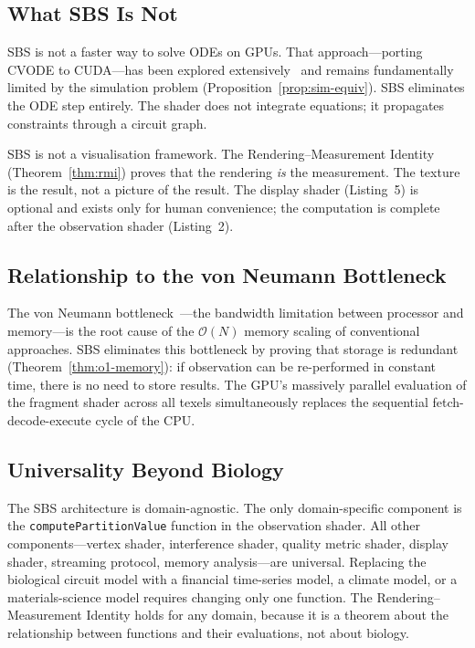 \documentclass[11pt,twocolumn,a4paper]{article}
\newcommand{\BigO}{\mathcal{O}}
\begin{document}
\subsection{What SBS Is Not}

SBS is not a faster way to solve ODEs on GPUs.  That approach---porting
CVODE to CUDA---has been explored extensively~\citep{owens2008,
nickolls2008} and remains fundamentally limited by the simulation
problem (Proposition~\ref{prop:sim-equiv}).  SBS eliminates the ODE
step entirely.  The shader does not integrate equations; it propagates
constraints through a circuit graph.

SBS is not a visualisation framework.  The Rendering--Measurement
Identity (Theorem~\ref{thm:rmi}) proves that the rendering \emph{is}
the measurement.  The texture is the result, not a picture of the
result.  The display shader (Listing~5) is optional and exists only
for human convenience; the computation is complete after the
observation shader (Listing~2).

\subsection{Relationship to the von Neumann Bottleneck}

The von Neumann bottleneck~\citep{backus1978}---the bandwidth
limitation between processor and memory---is the root cause of the
$\BigO(N)$ memory scaling of conventional approaches.  SBS eliminates
this bottleneck by proving that storage is redundant
(Theorem~\ref{thm:o1-memory}): if observation can be re-performed in
constant time, there is no need to store results.  The GPU's
massively parallel evaluation of the fragment shader across all texels
simultaneously replaces the sequential fetch-decode-execute cycle of
the CPU.

\subsection{Universality Beyond Biology}

The SBS architecture is domain-agnostic.  The only domain-specific
component is the \texttt{computePartitionValue} function in the
observation shader.  All other components---vertex shader, interference
shader, quality metric shader, display shader, streaming protocol,
memory analysis---are universal.  Replacing the biological circuit
model with a financial time-series model, a climate model, or a
materials-science model requires changing only one function.  The
Rendering--Measurement Identity holds for any domain, because it is a
theorem about the relationship between functions and their
evaluations, not about biology.
\end{document}
